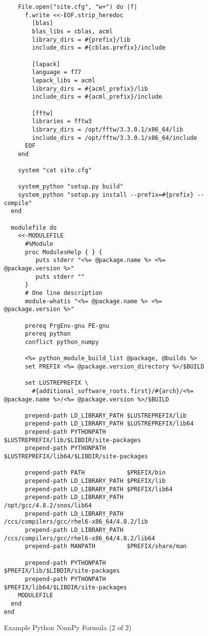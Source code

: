 \documentclass{acm_proc_article-sp}
\begin{document}
\begin{figure*}
\begin{verbatim}
    File.open("site.cfg", "w+") do |f|
      f.write <<-EOF.strip_heredoc
        [blas]
        blas_libs = cblas, acml
        library_dirs = #{prefix}/lib
        include_dirs = #{cblas.prefix}/include

        [lapack]
        language = f77
        lapack_libs = acml
        library_dirs = #{acml_prefix}/lib
        include_dirs = #{acml_prefix}/include

        [fftw]
        libraries = fftw3
        library_dirs = /opt/fftw/3.3.0.1/x86_64/lib
        include_dirs = /opt/fftw/3.3.0.1/x86_64/include
      EOF
    end

    system "cat site.cfg"

    system_python "setup.py build"
    system_python "setup.py install --prefix=#{prefix} --compile"
  end

  modulefile do
    <<-MODULEFILE
      #%Module
      proc ModulesHelp { } {
         puts stderr "<%= @package.name %> <%= @package.version %>"
         puts stderr ""
      }
      # One line description
      module-whatis "<%= @package.name %> <%= @package.version %>"

      prereq PrgEnv-gnu PE-gnu
      prereq python
      conflict python_numpy

      <%= python_module_build_list @package, @builds %>
      set PREFIX <%= @package.version_directory %>/$BUILD

      set LUSTREPREFIX \
        #{additional_software_roots.first}/#{arch}/<%= @package.name %>/<%= @package.version %>/$BUILD

      prepend-path LD_LIBRARY_PATH $LUSTREPREFIX/lib
      prepend-path LD_LIBRARY_PATH $LUSTREPREFIX/lib64
      prepend-path PYTHONPATH      $LUSTREPREFIX/lib/$LIBDIR/site-packages
      prepend-path PYTHONPATH      $LUSTREPREFIX/lib64/$LIBDIR/site-packages

      prepend-path PATH            $PREFIX/bin
      prepend-path LD_LIBRARY_PATH $PREFIX/lib
      prepend-path LD_LIBRARY_PATH $PREFIX/lib64
      prepend-path LD_LIBRARY_PATH /opt/gcc/4.8.2/snos/lib64
      prepend-path LD_LIBRARY_PATH /ccs/compilers/gcc/rhel6-x86_64/4.8.2/lib
      prepend-path LD_LIBRARY_PATH /ccs/compilers/gcc/rhel6-x86_64/4.8.2/lib64
      prepend-path MANPATH         $PREFIX/share/man

      prepend-path PYTHONPATH      $PREFIX/lib/$LIBDIR/site-packages
      prepend-path PYTHONPATH      $PREFIX/lib64/$LIBDIR/site-packages
    MODULEFILE
  end
end
\end{verbatim}
\label{fig:PythonNumpyFormula2}
\caption{Example Python NumPy Formula (2 of 2)}
\end{figure*}
\end{document}
